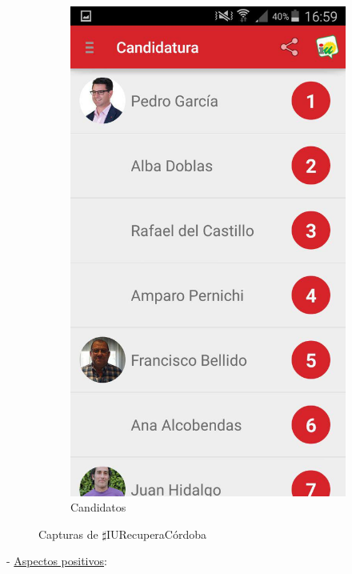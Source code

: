 \begin{figure}[H]
\begin{subfigure}[b]{0.3\textwidth}
                \includegraphics[width=\textwidth]{Media/Captures/IURecuperaCordobaCandidates.jpg}
                \caption{Candidatos}
                \label{fig:iuCandidates}
        \end{subfigure}
        \caption{Capturas de $\sharp$IURecuperaCórdoba}
        \label{fig:iuRecuperaCordoba}
\end{figure}

 - \underline{Aspectos positivos}:

